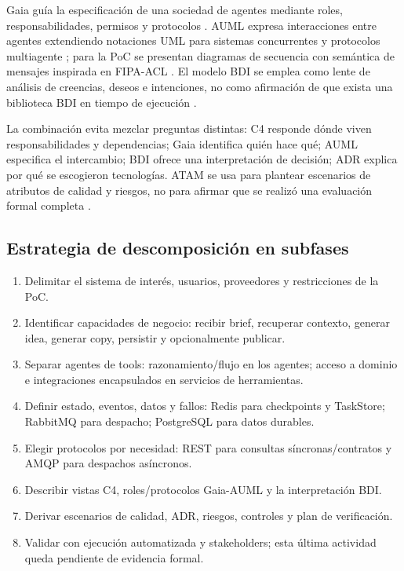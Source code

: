 \documentclass[12pt,oneside]{report}
\begin{document}
Gaia guía la especificación de una sociedad de agentes mediante roles, responsabilidades, permisos y protocolos \cite{gaia}. AUML expresa interacciones entre agentes extendiendo notaciones UML para sistemas concurrentes y protocolos multiagente \cite{aum1,aum2}; para la PoC se presentan diagramas de secuencia con semántica de mensajes inspirada en FIPA-ACL \cite{fipaacl}. El modelo BDI se emplea como lente de análisis de creencias, deseos e intenciones, no como afirmación de que exista una biblioteca BDI en tiempo de ejecución \cite{rao_georgeff}.

La combinación evita mezclar preguntas distintas: C4 responde dónde viven responsabilidades y dependencias; Gaia identifica quién hace qué; AUML especifica el intercambio; BDI ofrece una interpretación de decisión; ADR explica por qué se escogieron tecnologías. ATAM se usa para plantear escenarios de atributos de calidad y riesgos, no para afirmar que se realizó una evaluación formal completa \cite{atam}.

\subsection{Estrategia de descomposición en subfases}
\begin{enumerate}
  \item Delimitar el sistema de interés, usuarios, proveedores y restricciones de la PoC.
  \item Identificar capacidades de negocio: recibir brief, recuperar contexto, generar idea, generar copy, persistir y opcionalmente publicar.
  \item Separar agentes de tools: razonamiento/flujo en los agentes; acceso a dominio e integraciones encapsulados en servicios de herramientas.
  \item Definir estado, eventos, datos y fallos: Redis para checkpoints y TaskStore; RabbitMQ para despacho; PostgreSQL para datos durables.
  \item Elegir protocolos por necesidad: REST para consultas síncronas/contratos y AMQP para despachos asíncronos.
  \item Describir vistas C4, roles/protocolos Gaia-AUML y la interpretación BDI.
  \item Derivar escenarios de calidad, ADR, riesgos, controles y plan de verificación.
  \item Validar con ejecución automatizada y stakeholders; esta última actividad queda pendiente de evidencia formal.
\end{enumerate}
\end{document}
